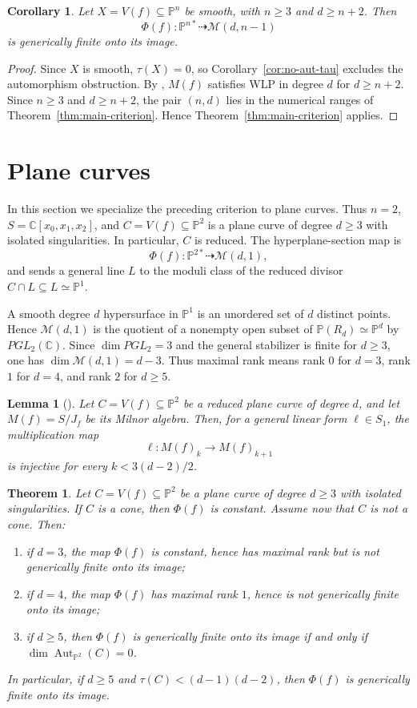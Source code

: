 \documentclass[11pt]{amsart}
\theoremstyle{plain}
\newtheorem{thm}[subsection]{Theorem}
\newtheorem{lem}[subsection]{Lemma}
\newtheorem{cor}[subsection]{Corollary}
\theoremstyle{definition}
\numberwithin{equation}{section}
\newcommand{\M}{{\mathcal M}}
\newcommand{\C}{\mathbb{C}}
\newcommand{\PP}{\mathbb{P}}
\DeclareMathOperator{\Aut}{Aut}
\begin{document}
\begin{cor}
\label{cor:smooth-high-degree}
Let $X=V(f)\subseteq\PP^n$ be smooth, with $n\geq3$ and $d\geq n+2$. Then
\[
\Phi(f):\PP^{n*}\dashrightarrow \M(d,n-1)
\]
is generically finite onto its image.
\end{cor}
\begin{proof}
Since $X$ is smooth, $\tau(X)=0$, so Corollary~\ref{cor:no-aut-tau} excludes the
automorphism obstruction. By \cite[Theorem~4.5]{BM}, $M(f)$ satisfies WLP in
degree $d$ for $d\geq n+2$. Since $n\geq3$ and $d\geq n+2$, the pair $(n,d)$ lies
in the numerical ranges of Theorem~\ref{thm:main-criterion}. Hence
Theorem~\ref{thm:main-criterion} applies.
\end{proof}
\section{Plane curves}
\label{sec:plane-curves}

In this section we specialize the preceding criterion to plane curves. Thus
$n=2$, $S=\C[x_0,x_1,x_2]$, and $C=V(f)\subseteq\PP^2$ is a plane curve of
degree $d\geq3$ with isolated singularities. In particular, $C$ is reduced. The
hyperplane-section map is
\[
\Phi(f):\PP^{2*}\dashrightarrow \M(d,1),
\]
and sends a general line $L$ to the moduli class of the reduced divisor
$C\cap L\subseteq L\simeq\PP^1$.

A smooth degree $d$ hypersurface in $\PP^1$ is an unordered set of $d$ distinct
points. Hence $\M(d,1)$ is the quotient of a nonempty open subset of
$\PP(R_d)\simeq\PP^d$ by $PGL_2(\C)$. Since $\dim PGL_2=3$ and the general
stabilizer is finite for $d\geq3$, one has $\dim\M(d,1)=d-3$. Thus maximal rank
means rank $0$ for $d=3$, rank $1$ for $d=4$, and rank $2$ for $d\geq5$.

\begin{lem}[{\cite[Corollary~4.4]{DPop}}]
\label{lem:DP-plane-lefschetz}
Let $C=V(f)\subseteq\PP^2$ be a reduced plane curve of degree $d$, and let
$M(f)=S/J_f$ be its Milnor algebra. Then, for a general linear form
$\ell\in S_1$, the multiplication map
\[
\ell:M(f)_k\to M(f)_{k+1}
\]
is injective for every $k<3(d-2)/2$.
\end{lem}

\begin{thm}
\label{thm:plane-curves}
Let $C=V(f)\subseteq\PP^2$ be a plane curve of degree $d\geq3$ with isolated
singularities. If $C$ is a cone, then $\Phi(f)$ is constant. Assume now that $C$
is not a cone. Then:
\begin{enumerate}
\item if $d=3$, the map $\Phi(f)$ is constant, hence has maximal rank but is not
generically finite onto its image;
\item if $d=4$, the map $\Phi(f)$ has maximal rank $1$, hence is not generically
finite onto its image;
\item if $d\geq5$, then $\Phi(f)$ is generically finite onto its image if and
only if $\dim\Aut_{\PP^2}(C)=0$.
\end{enumerate}
In particular, if $d\geq5$ and $\tau(C)<(d-1)(d-2)$, then $\Phi(f)$ is
generically finite onto its image.
\end{thm}
\end{document}
